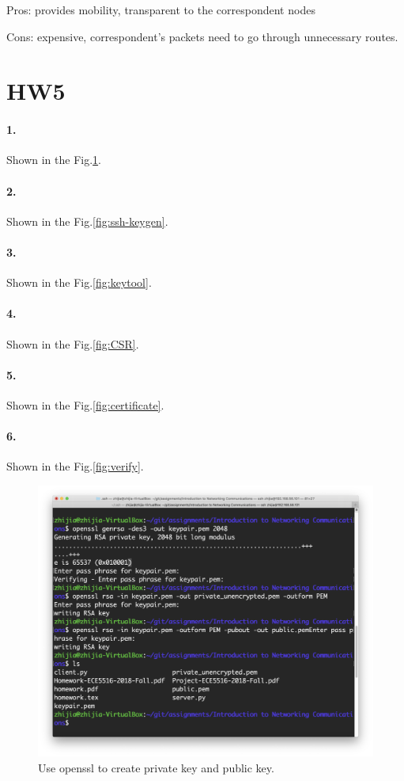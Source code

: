 \documentclass{article}
\begin{document}
Pros: provides mobility, transparent to the correspondent nodes

Cons: expensive, correspondent's packets need to go through unnecessary routes.

\section{HW5}

\paragraph{1.} Shown in the Fig.\ref{fig:openssl}.

\noindent \paragraph{2.} Shown in the Fig.\ref{fig:ssh-keygen}.

\noindent \paragraph{3.} Shown in the Fig.\ref{fig:keytool}.

\noindent \paragraph{4.} Shown in the Fig.\ref{fig:CSR}.

\noindent \paragraph{5.} Shown in the Fig.\ref{fig:certificate}.

\noindent \paragraph{6.} Shown in the Fig.\ref{fig:verify}.

\begin{figure}
    \centering
    \includegraphics[width=\linewidth]{fig/openssl.png}
    \caption{Use openssl to create private key and public key.
    } \label{fig:openssl}
\end{figure}
\end{document}
